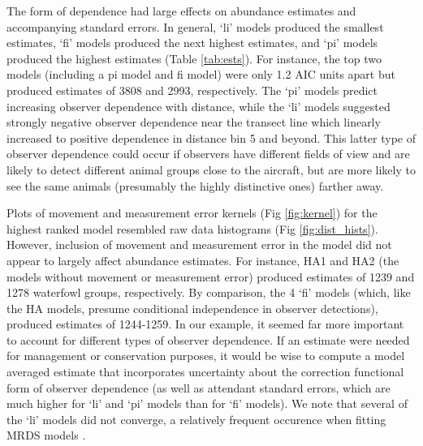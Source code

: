 \documentclass[12pt,fleqn]{article}
\begin{document}
The form of dependence had large effects on abundance estimates and accompanying standard errors. In general, `li' models produced the smallest estimates, `fi' models produced the next highest estimates, and `pi' models produced the highest estimates (Table \ref{tab:ests}).  For instance, the top two models (including a pi model and fi model) were only 1.2 AIC units apart but produced estimates of 3808 and 2993, respectively.  The `pi' models predict increasing observer dependence with distance, while the `li' models suggested strongly negative observer dependence near the transect line which linearly increased to positive dependence in distance bin 5 and beyond.  This latter type of observer dependence could occur if observers have different fields of view and are likely to detect different animal groups close to the aircraft, but are more likely to see the same animals (presumably the highly distinctive ones) farther away.

Plots of movement and measurement error kernels (Fig \ref{fig:kernel}) for the highest ranked model resembled raw data histograms (Fig \ref{fig:dist_hists}).  However, inclusion of movement and measurement error in the model did not appear to largely affect abundance estimates.  For instance, HA1 and HA2 (the models without movement or measurement error) produced estimates of 1239 and 1278 waterfowl groups, respectively.  By comparison, the 4 `fi' models (which, like the HA models, presume conditional independence in observer detections), produced estimates of 1244-1259.   In our example, it seemed far more important to account for different types of observer dependence.  If an estimate were needed for management or conservation purposes, it would be wise to compute a model averaged estimate that incorporates uncertainty about the correction functional form of observer dependence (as well as attendant standard errors, which are much higher for `li' and `pi' models than for `fi' models).  We note that several of the `li' models did not converge, a relatively frequent occurence when fitting MRDS models \cite{BucklandEtAl2010,MacKenzieClement2016}.
\end{document}
